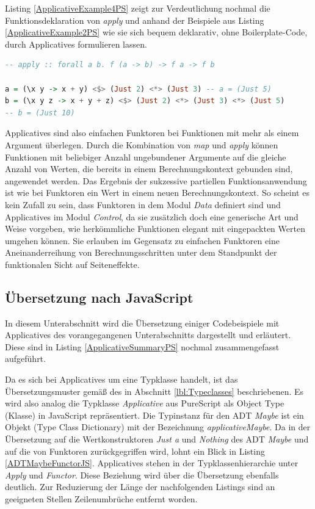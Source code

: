 \documentclass[
12pt,
ngerman,
oneside]
{scrbook} %
\begin{document}
Listing \ref{ApplicativeExample4PS} zeigt zur Verdeutlichung nochmal die Funktionsdeklaration von \emph{apply} und anhand der Beispiele aus Listing \ref{ApplicativeExample2PS} wie sie sich bequem deklarativ, ohne Boilerplate-Code, durch Applicatives formulieren lassen.

\begin{lstlisting}[language=purescript, style=numbered-and-boxed, caption=Aneinanderkettung von Berechnungen mit Applicatives in PS, label=ApplicativeExample4PS]
-- apply :: forall a b. f (a -> b) -> f a -> f b

a = (\x y -> x + y) <$> (Just 2) <*> (Just 3) -- a = (Just 5)
b = (\x y z -> x + y + z) <$> (Just 2) <*> (Just 3) <*> (Just 5) 
-- b = (Just 10)
\end{lstlisting}

Applicatives sind also einfachen Funktoren bei Funktionen mit mehr als einem Argument überlegen. Durch die Kombination von \emph{map} und \emph{apply} können Funktionen mit beliebiger Anzahl ungebundener Argumente auf die gleiche Anzahl von Werten, die bereits in einem Berechnungskontext gebunden sind, angewendet werden. Das Ergebnis der sukzessive partiellen Funktionsanwendung ist wie bei Funktoren ein Wert in einem neuen Berechnungskontext. So scheint es kein Zufall zu sein, dass Funktoren in dem Modul \emph{Data} definiert sind und Applicatives im Modul \emph{Control}, da sie zusätzlich doch eine generische Art und Weise vorgeben, wie herkömmliche Funktionen elegant mit eingepackten Werten umgehen können. Sie erlauben im Gegensatz zu einfachen Funktoren eine Aneinanderreihung von Berechnungsschritten unter dem Standpunkt der funktionalen Sicht auf Seiteneffekte.

\subsection{Übersetzung nach JavaScript}
In diesem Unterabschnitt  wird die Übersetzung einiger Codebeispiele mit Applicatives des vorangegangenen Unterabschnitts dargestellt und erläutert. Diese sind in Listing \ref{ApplicativeSummaryPS} nochmal zusammengefasst aufgeführt.

Da es sich bei Applicatives um eine Typklasse handelt, ist das Übersetzungsmuster gemäß des in Abschnitt \glqq \ref{lbl:Typeclasses} \grqq{} beschriebenen. Es wird also analog die Typklasse \emph{Applicative} aus PureScript als Object Type (Klasse) in JavaScript repräsentiert. Die Typinstanz für den ADT \emph{Maybe} ist ein Objekt (Type Class Dictionary) mit der Bezeichnung \emph{applicativeMaybe}.  Da in der Übersetzung auf die Wertkonstruktoren \emph{Just a} und \emph{Nothing} des ADT \emph{Maybe} und auf die von Funktoren zurückgegriffen wird, lohnt ein Blick in Listing \ref{ADTMaybeFunctorJS}. Applicatives stehen in der Typklassenhierarchie unter \emph{Apply} und \emph{Functor}. Diese Beziehung wird über die Übersetzung ebenfalls deutlich. Zur Reduzierung der Länge der nachfolgenden Listings sind an geeigneten Stellen Zeilenumbrüche entfernt worden.
\end{document}
